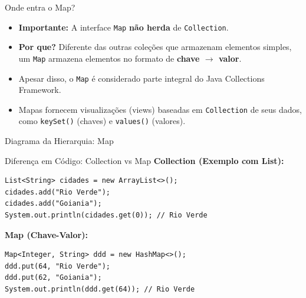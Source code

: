 \documentclass[9pt]{beamer}
\begin{document}
\begin{frame}{Onde entra o Map?}
    \begin{itemize}
        \item \textbf{Importante:} A interface \texttt{Map} \textbf{não herda} de \texttt{Collection}.
        \item \textbf{Por que?} Diferente das outras coleções que armazenam elementos simples, um \texttt{Map} armazena elementos no formato de \textbf{chave $\rightarrow$ valor}.
        \item Apesar disso, o \texttt{Map} é considerado parte integral do Java Collections Framework.
        \item Mapas fornecem visualizações (views) baseadas em \texttt{Collection} de seus dados, como \texttt{keySet()} (chaves) e \texttt{values()} (valores).
    \end{itemize}
\end{frame}

\begin{frame}{Diagrama da Hierarquia: Map}
    \begin{center}
    \end{center}
\end{frame}

\begin{frame}[fragile]{Diferença em Código: Collection vs Map}
    \textbf{Collection (Exemplo com List):}
    \begin{lstlisting}
List<String> cidades = new ArrayList<>();
cidades.add("Rio Verde");
cidades.add("Goiania");
System.out.println(cidades.get(0)); // Rio Verde
    \end{lstlisting}
    
    \vspace{0.3cm}
    \textbf{Map (Chave-Valor):}
    \begin{lstlisting}
Map<Integer, String> ddd = new HashMap<>();
ddd.put(64, "Rio Verde");
ddd.put(62, "Goiania");
System.out.println(ddd.get(64)); // Rio Verde
    \end{lstlisting}
\end{frame}
\end{document}
